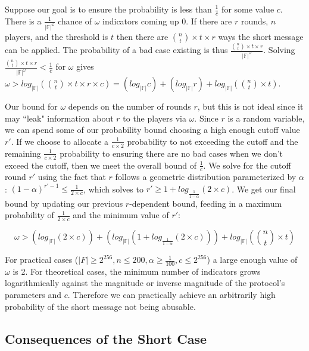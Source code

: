 \documentclass{dalcsthesis}
\begin{document}
Suppose our goal is to ensure the probability is less than $\frac{1}{c}$ for some value $c$. There is a $\frac{1}{|\mathbb{F}|^\omega}$ chance of $\omega$ indicators coming up 0. If there are $r$ rounds, $n$ players, and the threshold is $t$ then there are $\binom{n}{t} \times t \times r$ ways the short message can be applied. The probability of a bad case existing is thus $\frac{\binom{n}{t} \times t \times r}{|\mathbb{F}|^\omega}$. Solving $\frac{\binom{n}{t} \times t \times r}{|\mathbb{F}|^\omega} < \frac{1}{c}$ for $\omega$ gives $\omega > log_{|\mathbb{F}|} (\binom{n}{t} \times t \times r \times c) = (log_{|\mathbb{F}|} c) + (log_{|\mathbb{F}|} r) + log_{|\mathbb{F}|} (\binom{n}{t} \times t)$.

Our bound for $\omega$ depends on the number of rounds $r$, but this is not ideal since it may ``leak" information about $r$ to the players via $\omega$. Since $r$ is a random variable, we can spend some of our probability bound choosing a high enough cutoff value $r'$. If we choose to allocate a $\frac{1}{c \times 2}$ probability to not exceeding the cutoff and the remaining $\frac{1}{c \times 2}$ probability to ensuring there are no bad cases when we don't exceed the cutoff, then we meet the overall bound of $\frac{1}{c}$. We solve for the cutoff round $r'$ using the fact that $r$ follows a geometric distribution parameterized by $\alpha$: $(1 - \alpha)^{r'-1} \leq \frac{1}{2 \times c}$, which solves to $r' \geq 1 + log_{\frac{1}{1-\alpha}}(2 \times c)$. We get our final bound by updating our previous $r$-dependent bound, feeding in a maximum probability of $\frac{1}{2 \times c}$ and the minimum value of $r'$:

$$\omega > (log_{|\mathbb{F}|} (2 \times c)) + (log_{|\mathbb{F}|} (1 + log_{\frac{1}{1-\alpha}}(2 \times c))) + log_{|\mathbb{F}|} (\binom{n}{t} \times t)$$

For practical cases ($|F| \geq 2^{256}, n \leq 200, \alpha \geq \frac{1}{100}, c \leq 2^{256}$) a large enough value of $\omega$ is 2. For theoretical cases, the minimum number of indicators grows logarithmically against the magnitude or inverse magnitude of the protocol's parameters and $c$. Therefore we can practically achieve an arbitrarily high probability of the short message not being abusable.

\subsection{Consequences of the Short Case}
\end{document}
